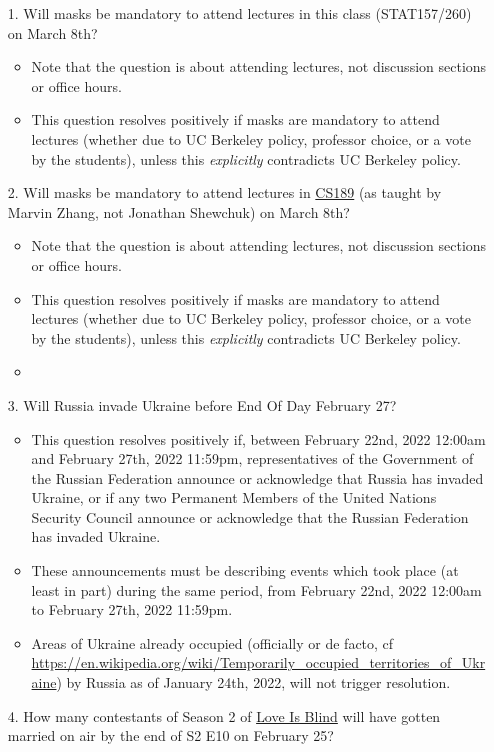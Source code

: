 \documentclass[11pt]{article}
\begin{document}
\begin{enumerate}
	\item[1.] Will masks be mandatory to attend lectures in this class (STAT157/260) on March 8th?
	\begin{itemize}
		\item Note that the question is about attending lectures, not discussion sections or office hours.
		\item This question resolves positively if masks are mandatory to attend lectures (whether due to UC Berkeley policy, professor choice, or a vote by the students), unless this \emph{explicitly} contradicts UC Berkeley policy.
	\end{itemize}
	\item[2.] Will masks be mandatory to attend lectures in \href{https://www.eecs189.org/about/}{CS189} (as taught by Marvin Zhang, not Jonathan Shewchuk) on March 8th?
	\begin{itemize}
		\item Note that the question is about attending lectures, not discussion sections or office hours.
		\item This question resolves positively if masks are mandatory to attend lectures (whether due to UC Berkeley policy, professor choice, or a vote by the students), unless this \emph{explicitly} contradicts UC Berkeley policy.
		\item 
	\end{itemize} 
	\item[3.] Will Russia invade Ukraine before End Of Day February 27?
	\begin{itemize}
		\item This question resolves positively if, between February 22nd, 2022 12:00am and February 27th, 2022 11:59pm, representatives of the Government of the Russian Federation announce or acknowledge that Russia has invaded Ukraine, or if any two Permanent Members of the United Nations Security Council announce or acknowledge that the Russian Federation has invaded Ukraine. 

		\item These announcements must be describing events which took place (at least in part) during the same period, from February 22nd, 2022 12:00am to February 27th, 2022 11:59pm. 
		
		\item Areas of Ukraine already occupied (officially or de facto, cf \url{https://en.wikipedia.org/wiki/Temporarily_occupied_territories_of_Ukraine}) by Russia as of January 24th, 2022, will not trigger resolution.
	\end{itemize} 
	\item[4.] How many contestants of Season 2 of \href{https://en.wikipedia.org/wiki/Love_Is_Blind_(TV_series)}{Love Is Blind} will have gotten married on air by the end of S2 E10 on February 25?
\end{enumerate}
\end{document}
